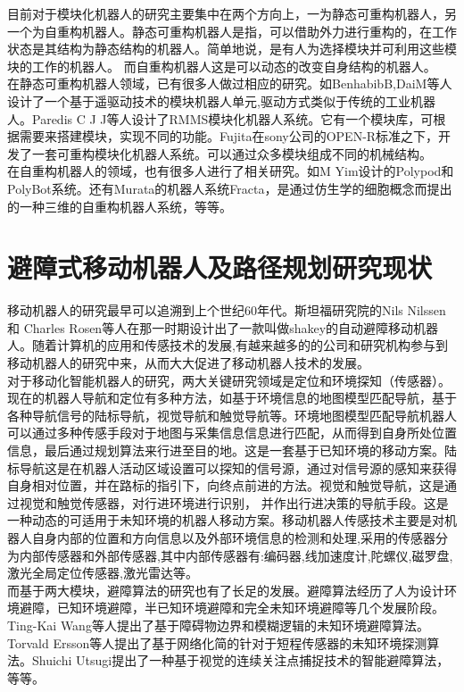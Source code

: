 目前对于模块化机器人的研究主要集中在两个方向上，一为静态可重构机器人，另一个为自重构机器人。静态可重构机器人是指，可以借助外力进行重构的，在工作状态是其结构为静态结构的机器人。简单地说，是有人为选择模块并可利用这些模块的工作的机器人。 而自重构机器人这是可以动态的改变自身结构的机器人。\\
在静态可重构机器人领域，已有很多人做过相应的研究。如BenhabibB,DaiM等人设计了一个基于遥驱动技术的模块机器人单元,驱动方式类似于传统的工业机器人。Paredis C J J等人设计了RMMS模块化机器人系统。它有一个模块库，可根据需要来搭建模块，实现不同的功能。Fujita在sony公司的OPEN-R标准之下，开发了一套可重构模块化机器人系统。可以通过众多模块组成不同的机械结构。 \\
在自重构机器人的领域，也有很多人进行了相关研究。如M Yim设计的Polypod和PolyBot系统。还有Murata的机器人系统Fracta，是通过仿生学的细胞概念而提出的一种三维的自重构机器人系统，等等。 \\

\section{避障式移动机器人及路径规划研究现状}
移动机器人的研究最早可以追溯到上个世纪60年代。斯坦福研究院的Nils Nilssen和 Charles Rosen等人在那一时期设计出了一款叫做shakey的自动避障移动机器人。随着计算机的应用和传感技术的发展,有越来越多的的公司和研究机构参与到移动机器人的研究中来，从而大大促进了移动机器人技术的发展。 \\
对于移动化智能机器人的研究，两大关键研究领域是定位和环境探知（传感器）。现在的机器人导航和定位有多种方法，如基于环境信息的地图模型匹配导航，基于各种导航信号的陆标导航，视觉导航和触觉导航等。环境地图模型匹配导航机器人可以通过多种传感手段对于地图与采集信息信息进行匹配，从而得到自身所处位置信息，最后通过规划算法来行进至目的地。这是一套基于已知环境的移动方案。陆标导航这是在机器人活动区域设置可以探知的信号源，通过对信号源的感知来获得自身相对位置，并在路标的指引下，向终点前进的方法。视觉和触觉导航，这是通过视觉和触觉传感器，对行进环境进行识别， 并作出行进决策的导航手段。这是一种动态的可适用于未知环境的机器人移动方案。移动机器人传感技术主要是对机器人自身内部的位置和方向信息以及外部环境信息的检测和处理,采用的传感器分为内部传感器和外部传感器,其中内部传感器有:编码器,线加速度计,陀螺仪,磁罗盘,激光全局定位传感器,激光雷达等。 \\
而基于两大模块，避障算法的研究也有了长足的发展。避障算法经历了人为设计环境避障，已知环境避障，半已知环境避障和完全未知环境避障等几个发展阶段。Ting-Kai Wang等人提出了基于障碍物边界和模糊逻辑的未知环境避障算法。Torvald Ersson等人提出了基于网络化简的针对于短程传感器的未知环境探测算法。Shuichi Utsugi提出了一种基于视觉的连续关注点捕捉技术的智能避障算法，等等。 \\

